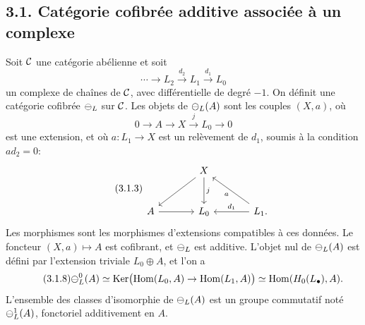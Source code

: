 \documentclass[11pt]{article}
\providecommand{\Ker}{\operatorname{Ker}}
\providecommand{\Hom}{\operatorname{Hom}}
\begin{document}
\subsection*{3.1. Cat\'egorie cofibr\'ee additive associ\'ee \`a un complexe}
Soit \(\mathcal C\) une cat\'egorie ab\'elienne et soit
\begin{equation}\tag{3.1.1}
  \cdots\longrightarrow L_2\xrightarrow{d_2}L_1\xrightarrow{d_1}L_0
\end{equation}
un complexe de cha\^ines de \(\mathcal C\), avec diff\'erentielle de degr\'e \(-1\).  On d\'efinit une cat\'egorie cofibr\'ee \(\mathcal\Psi_L\) sur \(\mathcal C\).  Les objets de \(\mathcal\Psi_L(A)\) sont les couples \((X,a)\), o\`u
\begin{equation}\tag{3.1.2}
  0\longrightarrow A\longrightarrow X\xrightarrow{j}L_0\longrightarrow0
\end{equation}
est une extension, et o\`u \(a:L_1\to X\) est un rel\`evement de \(d_1\), soumis \`a la condition \(a d_2=0\):
\begin{equation}\tag{3.1.3}
\begin{tikzcd}[column sep=large,row sep=large]
& X\arrow[d,"j"]\arrow[dl]&\\
A\arrow[r]&L_0&L_1\arrow[l,"d_1"']\arrow[ul,"a"] .
\end{tikzcd}
\end{equation}
Les morphismes sont les morphismes d'extensions compatibles \`a ces donn\'ees.  Le foncteur \((X,a)\mapsto A\) est cofibrant, et \(\mathcal\Psi_L\) est additive.  L'objet nul de \(\mathcal\Psi_L(A)\) est d\'efini par l'extension triviale \(L_0\oplus A\), et l'on a
\begin{equation}\tag{3.1.8}
  \cPsi_L^0(A)\simeq
  \Ker\bigl(\Hom(L_0,A)\to\Hom(L_1,A)\bigr)
  \simeq\Hom(H_0(L_\bullet),A).
\end{equation}
L'ensemble des classes d'isomorphie de \(\mathcal\Psi_L(A)\) est un groupe commutatif not\'e \(\mathcal\Psi_L^1(A)\), fonctoriel additivement en \(A\).
\end{document}
